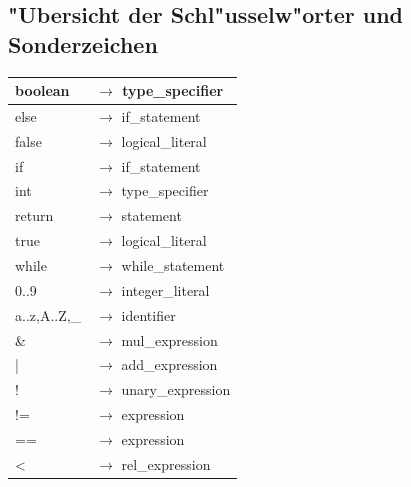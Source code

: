 \documentclass[10pt,a4paper,titlepage]{article}
\begin{document}
\subsection{"Ubersicht der Schl"usselw"orter und Sonderzeichen}
\begin{ttfamily}
\begin{tabular}{| l  l |}
\hline
\hspace*{1.5cm}boolean & $\to$ type\_specifier\hspace*{2cm}\\\hline
\hspace*{1.5cm}else & $\to$ if\_statement\hspace*{2cm}\\\hline
\hspace*{1.5cm}false & $\to$ logical\_literal\\\hline
\hspace*{1.5cm}if & $\to$ if\_statement\\\hline
\hspace*{1.5cm}int & $\to$ type\_specifier\\\hline
\hspace*{1.5cm}return & $\to$ statement\\\hline
\hspace*{1.5cm}true & $\to$ logical\_literal\\\hline
\hspace*{1.5cm}while & $\to$ while\_statement\\\hline
\hspace*{1.5cm}0..9 & $\to$ integer\_literal\\\hline
\hspace*{1.5cm}a..z,A..Z,\_\hspace*{1cm} & $\to$ identifier\\\hline
\hspace*{1.5cm}\& & $\to$ mul\_expression\\\hline
\hspace*{1.5cm}| & $\to$ add\_expression\\\hline
\hspace*{1.5cm}! & $\to$ unary\_expression\\\hline
\hspace*{1.5cm}!= & $\to$ expression\\\hline
\hspace*{1.5cm}== & $\to$ expression\\\hline
\hspace*{1.5cm}< & $\to$ rel\_expression\\\hline

\end{tabular}
\end{ttfamily}
\end{document}
